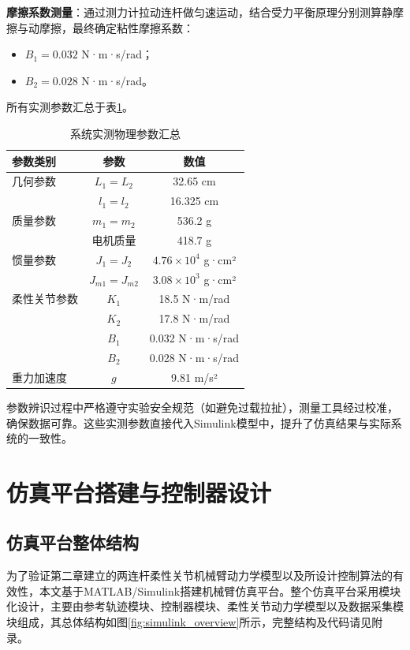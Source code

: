 \documentclass[12pt,hyperref,a4paper,UTF8]{ctexart}
\begin{document}
\textbf{摩擦系数测量}：通过测力计拉动连杆做匀速运动，结合受力平衡原理分别测算静摩擦与动摩擦，最终确定粘性摩擦系数：
\begin{itemize}
	\item $B_1 = 0.032$ N·m·s/rad；
	\item $B_2 = 0.028$ N·m·s/rad。
\end{itemize}

所有实测参数汇总于表\ref{tab:measured_params}。

\begin{table}[htbp]
	\centering
	\caption{系统实测物理参数汇总}
	\label{tab:measured_params}
	\begin{tabular}{lcc}
		\toprule
		参数类别 & 参数 & 数值 \\
		\midrule
		几何参数 & $L_1 = L_2$ & 32.65 cm \\
		& $l_1 = l_2$ & 16.325 cm \\
		质量参数 & $m_1 = m_2$ & 536.2 g \\
		& 电机质量 & 418.7 g \\
		惯量参数 & $J_1 = J_2$ & $4.76 \times 10^4$ g·cm² \\
		& $J_{m1} = J_{m2}$ & $3.08 \times 10^3$ g·cm² \\
		柔性关节参数 & $K_1$ & 18.5 N·m/rad \\
		& $K_2$ & 17.8 N·m/rad \\
		& $B_1$ & 0.032 N·m·s/rad \\
		& $B_2$ & 0.028 N·m·s/rad \\
		重力加速度 & $g$ & 9.81 m/s² \\
		\bottomrule
	\end{tabular}
\end{table}

参数辨识过程中严格遵守实验安全规范（如避免过载拉扯），测量工具经过校准，确保数据可靠。这些实测参数直接代入Simulink模型中，提升了仿真结果与实际系统的一致性。


\section{仿真平台搭建与控制器设计}

\subsection{仿真平台整体结构}

为了验证第二章建立的两连杆柔性关节机械臂动力学模型以及所设计控制算法的有效性，本文基于MATLAB/Simulink搭建机械臂仿真平台。整个仿真平台采用模块化设计，主要由参考轨迹模块、控制器模块、柔性关节动力学模型以及数据采集模块组成\cite{nuno2010adaptive}\cite{nuno2011passivity}\cite{nuno2014teleoperators}，其总体结构如图\ref{fig:simulink_overview}所示，完整结构及代码请见附录。
\end{document}
